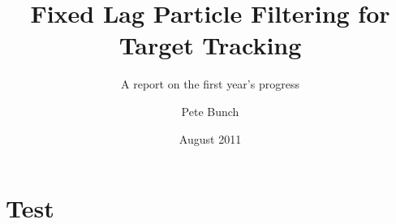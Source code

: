 \documentclass{RJWThesis}
\title{Fixed Lag Particle Filtering for Target Tracking}
\subtitle{A report on the first year's progress}
\author{Pete Bunch}
\date{August 2011}
\begin{document}
\chapter{Test}


\end{document}
